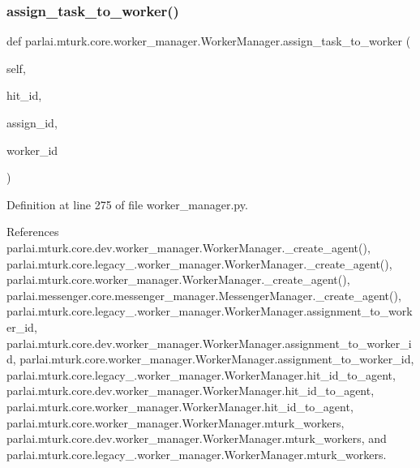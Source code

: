 \subsubsection{\texorpdfstring{assign\+\_\+task\+\_\+to\+\_\+worker()}{assign\_task\_to\_worker()}}
{\footnotesize\ttfamily def parlai.\+mturk.\+core.\+worker\+\_\+manager.\+Worker\+Manager.\+assign\+\_\+task\+\_\+to\+\_\+worker (\begin{DoxyParamCaption}\item[{}]{self,  }\item[{}]{hit\+\_\+id,  }\item[{}]{assign\+\_\+id,  }\item[{}]{worker\+\_\+id }\end{DoxyParamCaption})}



Definition at line 275 of file worker\+\_\+manager.\+py.



References parlai.\+mturk.\+core.\+dev.\+worker\+\_\+manager.\+Worker\+Manager.\+\_\+create\+\_\+agent(), parlai.\+mturk.\+core.\+legacy\+\_.\+worker\+\_\+manager.\+Worker\+Manager.\+\_\+create\+\_\+agent(), parlai.\+mturk.\+core.\+worker\+\_\+manager.\+Worker\+Manager.\+\_\+create\+\_\+agent(), parlai.\+messenger.\+core.\+messenger\+\_\+manager.\+Messenger\+Manager.\+\_\+create\+\_\+agent(), parlai.\+mturk.\+core.\+legacy\+\_.\+worker\+\_\+manager.\+Worker\+Manager.\+assignment\+\_\+to\+\_\+worker\+\_\+id, parlai.\+mturk.\+core.\+dev.\+worker\+\_\+manager.\+Worker\+Manager.\+assignment\+\_\+to\+\_\+worker\+\_\+id, parlai.\+mturk.\+core.\+worker\+\_\+manager.\+Worker\+Manager.\+assignment\+\_\+to\+\_\+worker\+\_\+id, parlai.\+mturk.\+core.\+legacy\+\_.\+worker\+\_\+manager.\+Worker\+Manager.\+hit\+\_\+id\+\_\+to\+\_\+agent, parlai.\+mturk.\+core.\+dev.\+worker\+\_\+manager.\+Worker\+Manager.\+hit\+\_\+id\+\_\+to\+\_\+agent, parlai.\+mturk.\+core.\+worker\+\_\+manager.\+Worker\+Manager.\+hit\+\_\+id\+\_\+to\+\_\+agent, parlai.\+mturk.\+core.\+worker\+\_\+manager.\+Worker\+Manager.\+mturk\+\_\+workers, parlai.\+mturk.\+core.\+dev.\+worker\+\_\+manager.\+Worker\+Manager.\+mturk\+\_\+workers, and parlai.\+mturk.\+core.\+legacy\+\_.\+worker\+\_\+manager.\+Worker\+Manager.\+mturk\+\_\+workers.

